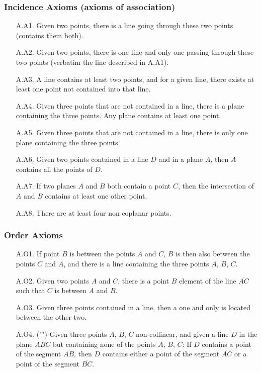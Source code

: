 	\subsubsection{Incidence Axioms (axioms of association)}
		\begin{enumerate}
			\item[A.A1.] Given two points, there is a line going through these two points (contains them both).
	
			\item[A.A2.] Given two points, there is one line and only  one passing through these two points (verbatim the line described in A.A1).
	
			\item[A.A3.] A line contains at least two points, and for a given line, there exists at least one point not contained into that line.
	
			\item[A.A4.] Given three points that are not contained in a line, there is a plane containing the three points. Any plane contains at least one point.
	
			\item[A.A5.] Given three points that are not contained in a line, there is only one plane containing the three points.
	
			\item[A.A6.] Given two points contained in a line $D$ and in a plane $A$, then $A$ contains all the points of $D$.
	
			\item[A.A7.] If two planes $A$ and $B$ both contain a point $C$, then the intersection of $A$ and $B$ contains at least one other point.
	
			\item[A.A8.] There are at least four non coplanar points.
		\end{enumerate}
		
	\subsubsection{Order Axioms}
	\begin{enumerate}
		\item[A.O1.] If point $B$ is between the points $A$ and $C$, $B$ is then also between the points $C$ and $A$, and there is a line containing the three points $A$, $B$, $C$.

		\item[A.O2.] Given two points $A$ and $C$, there is a point $B$ element of the line $\overline{AC}$ such that $C$ is between $A$ and $B$.

		\item[A.O3.]  Given three points contained in a line, then a one and only is located between the other two.

		\item[A.O4.] ("") Given three points $A$, $B$, $C$ non-collinear, and given a line $D$ in the plane $ABC$ but containing none of the points $A$, $B$, $C$: If $D$ contains a point of the segment $\overline{AB}$, then $D$ contains either a point of the segment $\overline{AC}$ or a point of the segment $\overline{BC}$.
	\end{enumerate}


